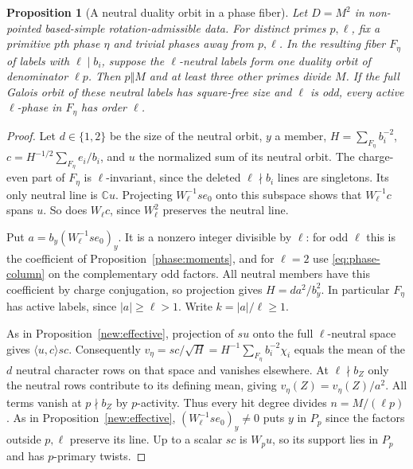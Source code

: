 \documentclass[11pt]{amsart}
\numberwithin{equation}{section}
\newtheorem{proposition}[theorem]{Proposition}
\theoremstyle{definition}
\theoremstyle{plain}
\begin{document}
\begin{proposition}[A neutral duality orbit in a phase fiber]
\label{new:one-neutral-fiber}
Let $D=M^2$ in non-pointed based-simple rotation-admissible data.
For distinct primes $p,\ell$, fix a primitive $p$th phase $\eta$
and trivial phases away from $p,\ell$. In the resulting fiber
$F_\eta$ of labels with $\ell\mid b_i$, suppose the $\ell$-neutral
labels form one duality orbit of denominator $\ell p$. Then $p\Vert M$ and at least three other primes
divide $M$. If the full Galois orbit of these neutral labels has
square-free size and $\ell$ is odd, every active $\ell$-phase in
$F_\eta$ has order $\ell$.
\end{proposition}
\begin{proof}
Let $d\in\{1,2\}$ be the size of the neutral orbit, $y$ a member,
$H=\sum_{F_\eta}b_i^{-2}$, $c=H^{-1/2}\sum_{F_\eta}e_i/b_i$,
and $u$ the normalized sum of its neutral orbit. The charge-even
part of $F_\eta$ is $\ell$-invariant, since the deleted
$\ell\nmid b_i$ lines are singletons. Its only neutral line is
$\mathbb C u$. Projecting $W_\ell^{-1}s e_0$ onto this subspace
shows that $W_\ell^{-1}c$ spans $u$. So does $W_\ell c$, since
$W_\ell^2$ preserves the neutral line.

Put $a=b_y(W_\ell^{-1}s e_0)_y$. It is a nonzero integer
divisible by $\ell$: for odd $\ell$ this is the coefficient of
Proposition~\ref{phase:moments}, and for $\ell=2$ use
\eqref{eq:phase-column} on the complementary odd factors.
All neutral members have this coefficient by charge conjugation,
so projection gives $H=d a^2/b_y^2$. In particular $F_\eta$ has
active labels, since $|a|\ge\ell>1$. Write $k=|a|/\ell\ge1$.

As in Proposition~\ref{new:effective}, projection of $su$ onto
the full $\ell$-neutral space gives $\langle u,c\rangle sc$.
Consequently $v_\eta=sc/\sqrt H=H^{-1}\sum_{F_\eta}
b_i^{-2}\chi_i$ equals the mean of the $d$ neutral character rows on
that space and vanishes elsewhere. At $\ell\nmid b_Z$ only the
neutral rows contribute to its defining mean, giving
$v_\eta(Z)=v_\eta(Z)/a^2$. All terms vanish at $p\nmid b_Z$
by $p$-activity. Thus every hit degree divides $n=M/(\ell p)$.
As in Proposition~\ref{new:effective}, $(W_\ell^{-1}se_0)_y\ne0$
puts $y$ in $P_p$ since the factors outside $p,\ell$ preserve its
line. Up to a scalar $sc$ is $W_pu$, so its support lies in $P_p$
and has $p$-primary twists.


\end{proof}
\end{document}

